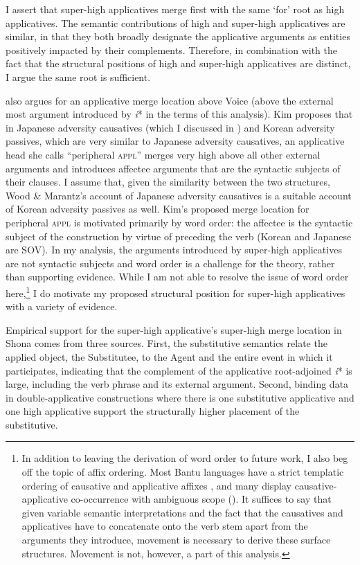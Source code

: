 \documentclass[output=paper,modfonts,nonflat,colorlinks,citecolor=brown]{langsci/langscibook}
\begin{document}
I assert that super-high applicatives merge first with the same ‘for’ root as high applicatives. The semantic contributions of high and super-high applicatives are similar, in that they both broadly designate the applicative arguments as entities positively impacted by their complements. Therefore, in combination with the fact that the structural positions of high and super-high applicatives are distinct, I argue the same root is sufficient.

\citet{Kim2011thesis,Kim2012heads} also argues for an applicative merge location above Voice (above the external most argument introduced by \textit{i}* in the terms of this analysis). Kim proposes that in Japanese adversity causatives (which I discussed in ) and Korean adversity passives, which are very similar to Japanese adversity causatives, an applicative head she calls “peripheral \textsc{appl}” merges very high above all other external arguments and introduces affectee arguments that are the syntactic subjects of their clauses. I assume that, given the similarity between the two structures, Wood \& Marantz’s account of Japanese adversity causatives is a suitable account of Korean adversity passives as well. Kim’s proposed merge location for peripheral \textsc{appl} is motivated primarily by word order: the affectee is the syntactic subject of the construction by virtue of preceding the verb (Korean and Japanese are SOV). In my analysis, the arguments introduced by super-high applicatives are not syntactic subjects and word order is a challenge for the theory, rather than supporting evidence. While I am not able to resolve the issue of word order here,\footnote{In addition to leaving the derivation of word order to future work, I also beg off the topic of affix ordering. Most Bantu languages have a strict templatic ordering of causative and applicative affixes \citep{Good2005}, and many display causative-applicative co-occurrence with ambiguous scope (\citealt{Baker1985,Hyman2002}). It suffices to say that given variable semantic interpretations and the fact that the causatives and applicatives have to concatenate onto the verb stem apart from the arguments they introduce, movement is necessary to derive these surface structures. Movement is not, however, a part of this analysis.}  I do motivate my proposed structural position for super-high applicatives with a variety of evidence.



Empirical support for the super-high applicative’s super-high merge location in Shona comes from three sources. First, the substitutive semantics relate the applied object, the Substitutee, to the Agent and the entire event in which it participates, indicating that the complement of the applicative root-adjoined \textit{i}* is large, including the verb phrase and its external argument.  Second, binding data in double-applicative constructions where there is one substitutive applicative and one high applicative support the structurally higher placement of the substitutive.
\end{document}
